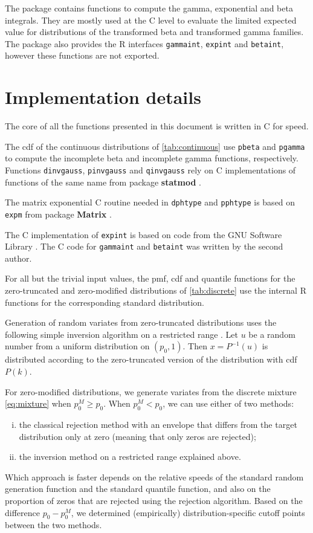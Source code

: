 \documentclass[x11names]{article}
\newcommand{\proglang}[1]{\textsf{#1}}
\newcommand{\pkg}[1]{\textbf{#1}}
\newcommand{\code}[1]{\texttt{#1}}
\begin{document}
The package contains functions to compute the gamma, exponential
and beta integrals. They are mostly used at the \proglang{C} level
to evaluate the limited expected value for distributions of the
transformed beta and transformed gamma families. The package also
provides the R interfaces \code{gammaint}, \code{expint} and
\code{betaint}, however these functions are not exported.


\section{Implementation details}
\label{sec:implementation}

The core of all the functions presented in this document is written in
\proglang{C} for speed.

The cdf of the continuous distributions of \autoref{tab:continuous}
use \code{pbeta} and \code{pgamma} to compute the incomplete beta and
incomplete gamma functions, respectively. Functions \code{dinvgauss},
\code{pinvgauss} and \code{qinvgauss} rely on \proglang{C}
implementations of functions of the same name from package
\pkg{statmod} \citep{statmod}.

The matrix exponential \proglang{C} routine needed in \code{dphtype}
and \code{pphtype} is based on \code{expm} from package
\pkg{Matrix} \citep{Matrix}.

The C implementation of \code{expint} is based on code from the GNU
Software Library \citep{GSL}. The \proglang{C} code for
\code{gammaint} and \code{betaint} was written by the second author.

For all but the trivial input values, the pmf, cdf and quantile
functions for the zero-truncated and zero-modified distributions of
\autoref{tab:discrete} use the internal \proglang{R} functions for the
corresponding standard distribution.

Generation of random variates from zero-truncated distributions uses
the following simple inversion algorithm on a restricted range
\citep{Dalgaard:r-help:2005,Thomopoulos:2013:simulation}. Let $u$ be a
random number from a uniform distribution on $(p_0, 1)$. Then
$x = P^{-1}(u)$ is distributed according to the zero-truncated version
of the distribution with cdf $P(k)$.

For zero-modified distributions, we generate variates from the
discrete mixture \eqref{eq:mixture} when $p_0^M \geq p_0$. When
$p_0^M < p_0$, we can use either of two methods:
\begin{enumerate}[i)]
\item the classical rejection method with an envelope that differs
  from the target distribution only at zero (meaning that only zeros
  are rejected);
\item the inversion method on a restricted range explained above.
\end{enumerate}
Which approach is faster depends on the relative speeds of the
standard random generation function and the standard quantile
function, and also on the proportion of zeros that are rejected using
the rejection algorithm. Based on the difference $p_0 - p_0^M$, we
determined (empirically) distribution-specific cutoff points between
the two methods.
\end{document}
